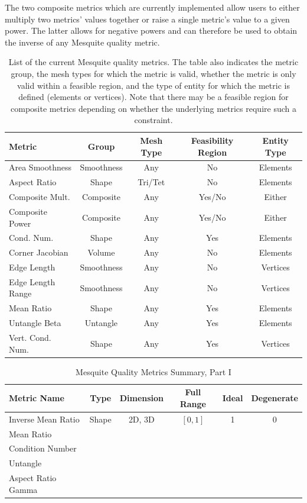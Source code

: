 \documentclass[psfig]{article}
\begin{document}
The two composite metrics which are currently implemented
allow users to either multiply two metrics' values
together or raise a single metric's value to a given power.
The latter allows for negative powers and can therefore be used
to obtain the inverse of any Mesquite quality metric.  

\begin{table}[htb]
\begin{center}
\begin{tabular}{|l|c|c|c|c|}
\hline
Metric & Group & Mesh Type & Feasibility Region &Entity Type\\
\hline
Area Smoothness &Smoothness & Any & No & Elements\\
Aspect Ratio & Shape &Tri/Tet & No & Elements\\
Composite Mult. & Composite &Any& Yes/No & Either\\
Composite Power & Composite &Any& Yes/No & Either\\
Cond. Num.& Shape & Any & Yes & Elements \\
Corner Jacobian & Volume & Any & No & Elements \\
Edge Length &Smoothness & Any & No & Vertices \\
Edge Length Range & Smoothness & Any &No & Vertices\\
Mean Ratio &Shape & Any & Yes &Elements\\
Untangle Beta &Untangle &Any&Yes&Elements\\
Vert. Cond. Num.& Shape & Any & Yes & Vertices\\
\hline
\end{tabular}
\label{current-metrics}
\caption{List of the current Mesquite quality metrics. The table also
indicates the metric group, the mesh types for which the metric is
valid, whether the metric is only valid within a feasible
region, and the type of entity for which the metric is defined (elements
or vertices).  Note that there may be a feasible region for composite
metrics depending on whether the underlying metrics require such a
constraint.}
\end{center}
\end{table}


\begin{table}[h]
\begin{center}
\begin{tabular}{|l|c|c|c|c|c|}
\hline
Metric Name & Type & Dimension & Full Range & Ideal & Degenerate \\ \hline
Inverse Mean Ratio & Shape & 2D, 3D & $[0,1]$ & 1 & 0 \\ 
Mean Ratio &  &  &  &  &  \\ 
Condition Number &  &  &  &  &  \\ 
Untangle &  &  &  &  &  \\ 
Aspect Ratio Gamma &  &  &  &  &  \\ 
\hline
\end{tabular}
\caption{\label{QualityMetrics1} Mesquite Quality Metrics Summary, Part I}
\end{center}
\end{table}
\end{document}
